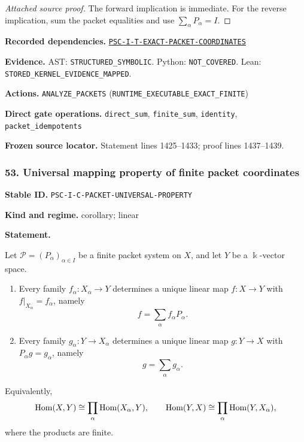 \documentclass[a4paper,11pt]{article}
\newcommand{\bbk}{\Bbbk}\newcommand{\A}{\mathcal A}\newcommand{\B}{\mathcal B}\newcommand{\Ccal}{\mathcal C}\newcommand{\Pcal}{\mathcal P}\newcommand{\Qcal}{\mathcal Q}\newcommand{\Rcal}{\mathcal R}\newcommand{\Scal}{\mathcal S}
\newcommand{\field}[2]{\noindent\textbf{#1.} #2\par}
\begin{document}
\begin{proof}[Attached source proof]
The forward implication is immediate.  For the reverse implication, sum the packet equalities and use $\sum_\alpha P_\alpha=I$.
\end{proof}
\field{Recorded dependencies}{\hyperref[rec:PSC-I-T-EXACT-PACKET-COORDINATES]{\nolinkurl{PSC-I-T-EXACT-PACKET-COORDINATES}}}
\field{Evidence}{AST: \nolinkurl{STRUCTURED_SYMBOLIC}. Python: \nolinkurl{NOT_COVERED}. Lean: \nolinkurl{STORED_KERNEL_EVIDENCE_MAPPED}.}
\field{Actions}{\nolinkurl{ANALYZE_PACKETS} (\nolinkurl{RUNTIME_EXECUTABLE_EXACT_FINITE})}
\field{Direct gate operations}{\nolinkurl{direct_sum}, \nolinkurl{finite_sum}, \nolinkurl{identity}, \nolinkurl{packet_idempotents}}
\field{Frozen source locator}{Statement lines 1425--1433; proof lines 1437--1439.}
\subsubsection*{53. Universal mapping property of finite packet coordinates}
\label{rec:PSC-I-C-PACKET-UNIVERSAL-PROPERTY}
\field{Stable ID}{\nolinkurl{PSC-I-C-PACKET-UNIVERSAL-PROPERTY}}
\field{Kind and regime}{corollary; linear}
\textbf{Statement.}\par
Let \(\Pcal=(P_\alpha)_{\alpha\in I}\) be a finite packet system on \(X\), and let \(Y\) be a \(\bbk\)-vector space.
\begin{enumerate}
\item Every family \(f_\alpha:X_\alpha\to Y\) determines a unique linear map \(f:X\to Y\) with \(f|_{X_\alpha}=f_\alpha\), namely
\[
f=\sum_\alpha f_\alpha P_\alpha.
\]
\item Every family \(g_\alpha:Y\to X_\alpha\) determines a unique linear map \(g:Y\to X\) with \(P_\alpha g=g_\alpha\), namely
\[
g=\sum_\alpha g_\alpha.
\]
\end{enumerate}
Equivalently,
\[
\operatorname{Hom}(X,Y)\cong\prod_\alpha\operatorname{Hom}(X_\alpha,Y),
\qquad
\operatorname{Hom}(Y,X)\cong\prod_\alpha\operatorname{Hom}(Y,X_\alpha),
\]
where the products are finite.
\end{document}
